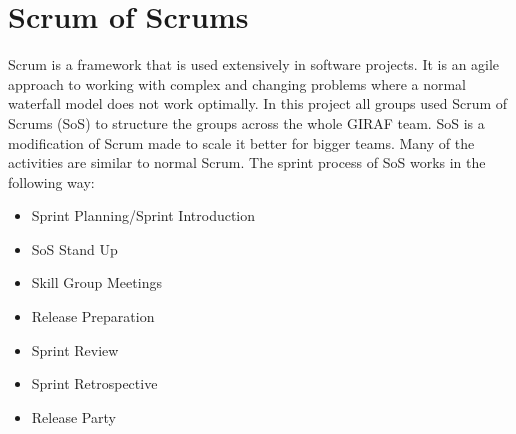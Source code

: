 \section{Scrum of Scrums}\label{scrum-of-scrums}
Scrum is a framework that is used extensively in software projects.
It is an agile approach to working with complex and changing problems where a normal waterfall model does not work optimally.
In this project all groups used Scrum of Scrums (SoS) to structure the groups across the whole GIRAF team.
SoS is a modification of Scrum made to scale it better for bigger teams.
Many of the activities are similar to normal Scrum.
The sprint process of SoS works in the following way:

\begin{itemize}
    \item Sprint Planning/Sprint Introduction
    \item SoS Stand Up
    \item Skill Group Meetings
    \item Release Preparation
    \item Sprint Review
    \item Sprint Retrospective
    \item Release Party
\end{itemize}

